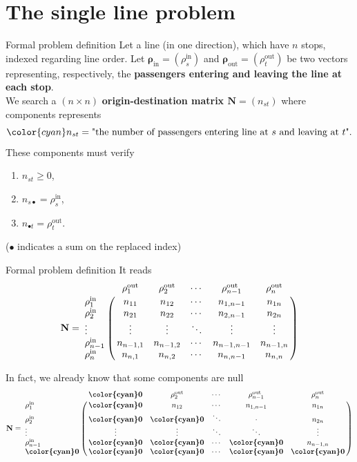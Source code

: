 \documentclass[10pt]{beamer}
\newcommand{\imp}[1]{\textbf{\color{cyan}#1}}
\begin{document}
	\section{The single line problem}
	
	
	\begin{frame}{Formal problem definition}
		Let a line (in one direction), which have $n$ stops, indexed regarding line order. Let \imp{$\bm{\rho}_\text{in} = (\rho^\text{in}_s)$} and \imp{$\bm{\rho}_\text{out} = (\rho^\text{out}_t)$} be two vectors representing, respectively, the \imp{passengers entering and leaving the line at each stop}. \\
		\vspace{0.4cm}
		We search a $(n \times n)$ \imp{origin-destination matrix $\mathbf{N} = (n_{st})$} where components represents
		$$
			{\color{cyan} n_{st} = \text{"the number of passengers entering line at $s$ and leaving at $t$"}}.
		$$
		These components must verify
		\begin{enumerate}
			\item $n_{st} \geq 0$,
			\item $n_{s\bullet} = \rho^\text{in}_s$,
			\item $n_{\bullet t} = \rho^\text{out}_t$.
		\end{enumerate}
		\small ($\bullet$ indicates a sum on the replaced index)
	\end{frame}
	
	
	\begin{frame}{Formal problem definition}
		\small
		It reads
		$$
		\mathbf{N} = \bordermatrix{
			& \rho^\text{out}_1 & \rho^\text{out}_2  & \cdots & \rho^\text{out}_{n-1} & \rho^\text{out}_n   \cr
			\rho^\text{in}_1 & n_{11} & n_{12} & \cdots & n_{1,n-1} & n_{1n} \cr
			\rho^\text{in}_2 & n_{21} & n_{22} & \cdots & n_{2,n-1} & n_{2n} \cr
			\vdots & \vdots & \vdots & \ddots & \vdots & \vdots \cr
			\rho^\text{in}_{n-1} & n_{n-1,1} & n_{n-1,2} & \cdots & n_{n-1,n-1} & n_{n-1,n} \cr
			\rho^\text{in}_{n} & n_{n,1} & n_{n,2} & \cdots & n_{n,n-1} & n_{n,n}}
		$$
		
		In fact, we already know that some components are null
		$$
		\mathbf{N} = \bordermatrix{
			& \imp{0} & \rho^\text{out}_2  & \cdots & \rho^\text{out}_{n-1} & \rho^\text{out}_n \cr
			\rho^\text{in}_1 & \imp{0} & n_{12} & \cdots & n_{1,n-1} & n_{1n} \cr
			\rho^\text{in}_2 & \imp{0} & \imp{0} & \ddots & \cdot & n_{2n} \cr
			\vdots & \vdots & \vdots & \ddots & \ddots & \vdots \cr
			\rho^\text{in}_{n-1} & \imp{0} & \imp{0} & \cdots & \imp{0} & n_{n-1,n} \cr
			\imp{0} & \imp{0} & \imp{0} & \cdots & \imp{0} & \imp{0}}
		$$
	\end{frame}
	
\end{document}
